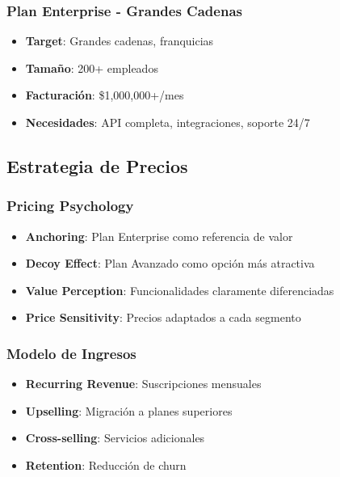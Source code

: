 \documentclass[12pt,a4paper]{article}
\begin{document}
\subsubsection{Plan Enterprise - Grandes Cadenas}

\begin{itemize}
    \item \textbf{Target}: Grandes cadenas, franquicias
    \item \textbf{Tamaño}: 200+ empleados
    \item \textbf{Facturación}: \$1,000,000+/mes
    \item \textbf{Necesidades}: API completa, integraciones, soporte 24/7
\end{itemize}

\subsection{Estrategia de Precios}

\subsubsection{Pricing Psychology}

\begin{itemize}
    \item \textbf{Anchoring}: Plan Enterprise como referencia de valor
    \item \textbf{Decoy Effect}: Plan Avanzado como opción más atractiva
    \item \textbf{Value Perception}: Funcionalidades claramente diferenciadas
    \item \textbf{Price Sensitivity}: Precios adaptados a cada segmento
\end{itemize}

\subsubsection{Modelo de Ingresos}

\begin{itemize}
    \item \textbf{Recurring Revenue}: Suscripciones mensuales
    \item \textbf{Upselling}: Migración a planes superiores
    \item \textbf{Cross-selling}: Servicios adicionales
    \item \textbf{Retention}: Reducción de churn
\end{itemize}
\end{document}
